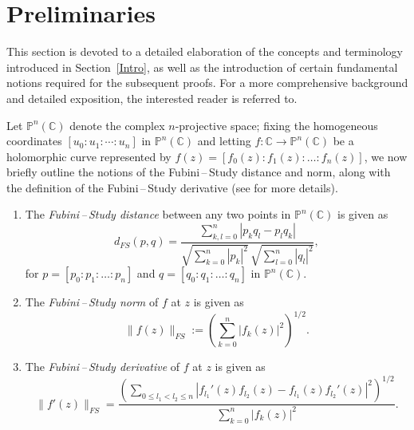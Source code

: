 \documentclass[11pt, reqno]{amsart}
\theoremstyle{definition}
\theoremstyle{remark}
\numberwithin{equation}{section}
\begin{document}
\section{Preliminaries}\label{Prelim}

 This section is devoted to a detailed elaboration of the concepts and terminology introduced in Section~\ref{Intro}, as well as the introduction of certain fundamental notions required for the subsequent proofs. For a more comprehensive background and detailed exposition, the interested reader is referred to\cite{ere-nhcfprtps-2007, ere-bcoh-2008, pang-axostfnf-2015, quang-wnaqfohc-2018, li-goptwmh-2021, deth-nfommoscvfmhiacps-2015, yang-anotacfnf-2020, yang-hmitcpswmh-2021, fuji-ofommitcps-1974}.\smallskip

Let $\mathbb{P}^n(\mathbb{C})$ denote the complex $n$-projective space; fixing the homogeneous coordinates $[u_0:u_1:\cdots:u_n]$
in $\mathbb P^n(\mathbb C)$ and letting $f : \mathbb{C} \to \mathbb{P}^n(\mathbb{C})$ be a holomorphic curve represented by 
$f(z) = [f_0(z) : f_1(z) : \dots : f_n(z)]$, 
we now briefly outline the notions of the Fubini\,--\,Study distance and norm, along with the definition of the Fubini\,--\,Study derivative (see \cite{ere-nhcfprtps-2007, quang-wnaqfohc-2018, yang-anotacfnf-2020, yang-hmitcpswmh-2021, fuji-ofommitcps-1974} for more details).

\begin{enumerate}
    \item The \emph{Fubini\,--\,Study distance} between any two points in $\mathbb P^n(\mathbb C)$ is given as
\begin{equation*}
d_{FS}(p,q) = \frac{\sum_{k,l=0}^n |p_k q_l - p_l q_k|}{\sqrt{\sum_{k=0}^n |p_k|^2} \, \sqrt{\sum_{l=0}^n |q_l|^2}},
\end{equation*}
for $p = [p_0 : p_1 : \dots : p_n]$ and $q = [q_0 : q_1 : \dots : q_n]$ in $\mathbb{P}^n(\mathbb{C})$. \smallskip
    \item The \emph{Fubini\,--\,Study norm} of $f$ at $z$ is given as \begin{equation*}
\|f(z)\|_{FS} := \left( \sum_{k=0}^n |f_k(z)|^2 \right)^{1/2}.
\end{equation*}
    \item The \emph{Fubini\,--\,Study derivative} of $f$ at $z$ is given as \begin{equation*}
\|f'(z)\|_{FS} = 
\frac{\left( \sum_{0 \le l_1 < l_2 \le n} 
\left| f_{l_1}'(z) f_{l_2}(z) - f_{l_1}(z) f_{l_2}'(z) \right|^2 \right)^{1/2}}
{\sum_{k=0}^n |f_k(z)|^2}.
\end{equation*}
\end{enumerate}\smallskip
\end{document}
